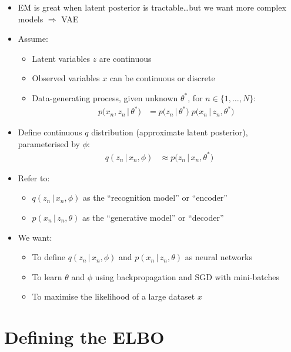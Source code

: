 \documentclass{article}
\begin{document}
\begin{itemize}
    \item EM is great when latent posterior is tractable\dots but we want more complex models $\Rightarrow$ VAE
    \item Assume:
    \begin{itemize}
        \item Latent variables $z$ are continuous
        \item Observed variables $x$ can be continuous or discrete
        \item Data-generating process, given unknown $\theta^*$, for $n\in\{1,\dots,N\}$:
        \begin{align}
            p\bigl(x_n, z_n \,\vert\, \theta^*\bigr) &= p\bigl( z_n \,\vert\, \theta^* \bigr)\;p\bigl( x_n \,\vert\, z_n, \theta^* \bigr)
        \end{align}
    \end{itemize}
    \item Define continuous $q$ distribution (approximate latent posterior), parameterised by $\phi$:
    \begin{align}
        q(z_n \,\vert\, x_n, \phi) &\approx p\bigl( z_n \,\vert\, x_n, \theta^* \bigr)
    \end{align}
    \item Refer to:
    \begin{itemize}
        \item $q(z_n \,\vert\, x_n, \phi)$ as the ``recognition model'' or ``encoder''
        \item $p(x_n \,\vert\, z_n, \theta)$ as the ``generative model'' or ``decoder''
    \end{itemize}
    \item We want:
    \begin{itemize}
        \item To define $q(z_n \,\vert\, x_n, \phi)$ and $p(x_n \,\vert\, z_n, \theta)$ as neural networks
        \item To learn $\theta$ and $\phi$ using backpropagation and SGD with mini-batches
        \item To maximise the likelihood of a large dataset $x$
    \end{itemize}
\end{itemize}

\newpage
\section{Defining the ELBO}
\end{document}
